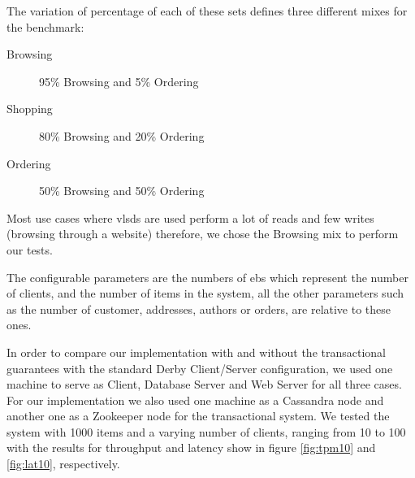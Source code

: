 The variation of percentage of each of these sets defines three different mixes for the benchmark:

\begin{description}
	\item[Browsing] 95\% Browsing and 5\% Ordering
	\item[Shopping] 80\% Browsing and 20\% Ordering
	\item[Ordering] 50\% Browsing and 50\% Ordering
\end{description}

Most use cases where \acp{vlsd} are used perform a lot of reads and few writes (browsing through a website) therefore, we chose the Browsing mix to perform our tests.

The configurable parameters are the numbers of \acp{eb} which represent the number of clients, and the number of items in the system, all the other parameters such as the number of customer, addresses, authors or orders, are relative to these ones.

In order to compare our implementation with and without the transactional guarantees with the standard Derby Client/Server configuration, we used one machine to serve as Client, Database Server and Web Server for all three cases. For our implementation we also used one machine as a Cassandra node and another one as a Zookeeper node for the transactional system. We tested the system with 1000 items and a varying number of clients, ranging from 10 to 100 with the results for throughput and latency show in figure \ref{fig:tpm10} and \ref{fig:lat10}, respectively.

